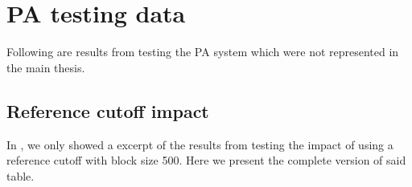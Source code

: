\chapter{PA testing data}
\label{chap:app-PA}
Following are results from testing the PA system which were not represented in the main thesis.
\section{Reference cutoff impact}
\label{sec:app-PA-reference-cutoff}
In , we only showed a excerpt of the results from testing the impact of using a reference cutoff with block size 500. Here we present the complete version of said table.

%

